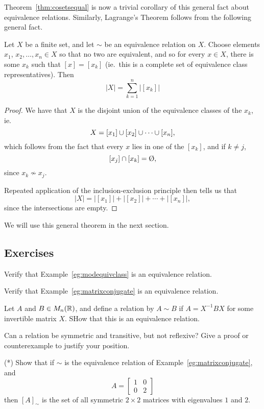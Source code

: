 Theorem~\ref{thm:cosetsequal} is now a trivial corollary of this general fact
about equivalence relations.  Similarly, Lagrange's Theorem follows from the
following general fact.

\begin{theorem}\label{thm:countingequivalenceclasses}
  Let $X$ be a finite set, and let $\sim$ be an equivalence relation on $X$.
  Choose elements $x_{1}$, $x_{2}, \ldots, x_{n} \in X$ so that no two are
  equivalent, and so for every $x \in X$, there is some $x_{k}$ such that
  $[x] = [x_{k}]$ (ie.~this is a complete set of equivalence class
  representatives).  Then
  \[
    |X| = \sum_{k=1}^{n} |[x_{k}]|
  \]
\end{theorem}
\begin{proof}
  We have that $X$ is the disjoint union of the equivalence classes of the
  $x_{k}$, ie.
  \[
    X = [x_{1}] \cup [x_{2}] \cup \cdots \cup [x_{n}],
  \]
  which follows from the fact that every $x$ lies in one of the $[x_{k}]$,
  and if $k \ne j$,
  \[
    [x_{j}] \intersect [x_{k}] = \emptyset,
  \]
  since $x_{k} \not\sim x_{j}$.
  
  Repeated application of the inclusion-exclusion principle then tells us
  that
  \[
    |X| = |[x_{1}]| + |[x_{2}]| + \cdots + |[x_{n}]|,
  \]
  since the intersections are empty.
\end{proof}

We will use this general theorem in the next section.

\subsection*{Exercises}

\begin{exercises}
  \item Verify that Example~\ref{eg:modequivclass} is an equivalence 
  relation.
  
  \item Verify that Example~\ref{eg:matrixconjugate} is an equivalence 
  relation.
  
  \item Let $A$ and $B \in M_{n}(\mathbb{R})$, and define a relation by $A 
    \sim B$ if $A = X^{-1}BX$ for some invertible matrix $X$.  SHow 
    that this is an equivalence relation.
  
  \item Can a relation be symmetric and transitive, but not reflexive? Give a proof or counterexample to justify your position.
  
  \item (*) Show that if $\sim$ is the equivalence relation of 
  Example~\ref{eg:matrixconjugate}, and
  \[
    A = \begin{bmatrix}
      1 & 0 \\
      0 & 2
    \end{bmatrix}
  \]
  then $[A]_{\sim}$ is the set of all symmetric $2 \times 2$ matrices with 
  eigenvalues $1$ and $2$.
\end{exercises}

